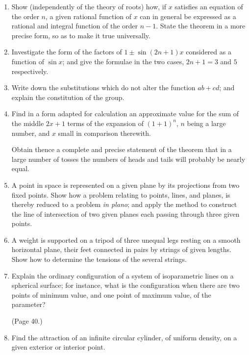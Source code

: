 \documentclass[11pt,a4paper]{article}
\begin{document}
\begin{enumerate}[label=\arabic*.,leftmargin=*]
\item Show (independently of the theory of roots) how, if $x$ satisfies an equation of the order $n$, a given rational function of $x$ can in general be expressed as a rational and integral function of the order $n - 1$. State the theorem in a more precise form, so as to make it true universally.

\item Investigate the form of the factors of $1 \pm \sin (2n + 1) x$ considered as a function of $\sin x$; and give the formulae in the two cases, $2n + 1 = 3$ and $5$ respectively.

\item Write down the substitutions which do not alter the function $ab + cd$; and explain the constitution of the group.

\item Find in a form adapted for calculation an approximate value for the sum of the middle $2x + 1$ terms of the expansion of $(1 + 1)^n$, $n$ being a large number, and $x$ small in comparison therewith.

Obtain thence a complete and precise statement of the theorem that in a large number of tosses the numbers of heads and tails will probably be nearly equal.

\item A point in space is represented on a given plane by its projections from two fixed points. Show how a problem relating to points, lines, and planes, is thereby reduced to a problem \textit{in plano}; and apply the method to construct the line of intersection of two given planes each passing through three given points.

\item A weight is supported on a tripod of three unequal legs resting on a smooth horizontal plane, their feet connected in pairs by strings of given lengths. Show how to determine the tensions of the several strings.

\item Explain the ordinary configuration of a system of isoparametric lines on a spherical surface; for instance, what is the configuration when there are two points of minimum value, and one point of maximum value, of the parameter?

\bigskip

\noindent (Page 40.)
\item Find the attraction of an infinite circular cylinder, of uniform density, on a given exterior or interior point.


\end{enumerate}
\end{document}
